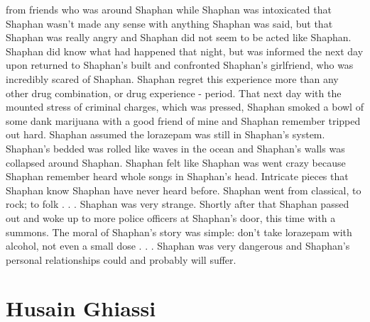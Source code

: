 \documentclass[12pt]{book}
\begin{document}
from friends who was around Shaphan while Shaphan was intoxicated that Shaphan wasn't made any sense with anything Shaphan was said, but that Shaphan was really angry and Shaphan did not seem to be acted like Shaphan. Shaphan did know what had happened that night, but was informed the next day upon returned to Shaphan's built and confronted Shaphan's girlfriend, who was incredibly scared of Shaphan. Shaphan regret this experience more than any other drug combination, or drug experience - period. That next day with the mounted stress of criminal charges, which was pressed, Shaphan smoked a bowl of some dank marijuana with a good friend of mine and Shaphan remember tripped out hard. Shaphan assumed the lorazepam was still in Shaphan's system. Shaphan's bedded was rolled like waves in the ocean and Shaphan's walls was collapsed around Shaphan. Shaphan felt like Shaphan was went crazy because Shaphan remember heard whole songs in Shaphan's head. Intricate pieces that Shaphan know Shaphan have never heard before. Shaphan went from classical, to rock; to folk . . .  Shaphan was very strange. Shortly after that Shaphan passed out and woke up to more police officers at Shaphan's door, this time with a summons. The moral of Shaphan's story was simple: don't take lorazepam with alcohol, not even a small dose . . .  Shaphan was very dangerous and Shaphan's personal relationships could and probably will suffer.



\chapter{Husain Ghiassi}
\end{document}
